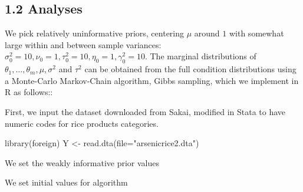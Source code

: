 \documentclass[]{article}
\newenvironment{Shaded}{\begin{snugshade}}{\end{snugshade}}
\newcommand{\KeywordTok}[1]{\textcolor[rgb]{0.94,0.87,0.69}{{#1}}}
\newcommand{\DataTypeTok}[1]{\textcolor[rgb]{0.87,0.87,0.75}{{#1}}}
\newcommand{\DecValTok}[1]{\textcolor[rgb]{0.86,0.86,0.80}{{#1}}}
\newcommand{\StringTok}[1]{\textcolor[rgb]{0.80,0.58,0.58}{{#1}}}
\newcommand{\CommentTok}[1]{\textcolor[rgb]{0.50,0.62,0.50}{{#1}}}
\newcommand{\OtherTok}[1]{\textcolor[rgb]{0.94,0.94,0.56}{{#1}}}
\newcommand{\NormalTok}[1]{\textcolor[rgb]{0.80,0.80,0.80}{{#1}}}
\begin{document}
\subsection{1.2 Analyses}

We pick relatively uninformative priors, centering \(\mu\) around \(1\)
with somewhat large within and between sample variances:
\(\sigma^2_0 = 10, \nu_0 = 1, \tau_0^2 = 10, \eta_0=1, \gamma_0^2 = 10\).
The marginal distributions of
\(\theta_1, \ldots, \theta_m, \mu, \sigma^2\) and \(\tau^2\) can be
obtained from the full condition distributions using a Monte-Carlo
Markov-Chain algorithm, Gibbs sampling, which we implement in R as
follows::\newline

First, we input the dataset downloaded from Sakai, modified in Stata to
have numeric codes for rice products categories.

\begin{Shaded}
\begin{Highlighting}[]
\KeywordTok{library}\NormalTok{(foreign)}
\NormalTok{Y <-}\StringTok{ }\KeywordTok{read.dta}\NormalTok{(}\DataTypeTok{file=}\StringTok{"arsenicrice2.dta"}\NormalTok{)}
\end{Highlighting}
\end{Shaded}

We set the weakly informative prior values

\begin{Shaded}
\end{Shaded}

We set initial values for algorithm

\begin{Shaded}
\end{Shaded}
\end{document}
